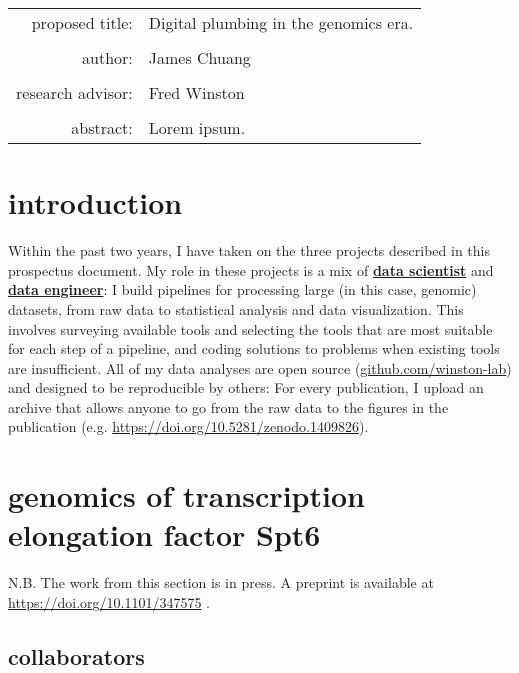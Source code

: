 \documentclass[9pt, letterpaper]{article}
\begin{document}
\begin{titlepage}
\begin{tabular}{ r l }
 proposed title:   & Digital plumbing in the genomics era. \\
 		   & \\
 author:	   & James Chuang \\
 		   & \\
 research advisor: & Fred Winston \\
 		   & \\
 abstract:	   & Lorem ipsum.
\end{tabular}
\end{titlepage}

\tableofcontents
\newpage

\section{introduction}

Within the past two years, I have taken on the three projects described in this prospectus document. My role in these projects is a mix of \href{https://blog.insightdatascience.com/data-science-vs-data-engineering-62da7678adaa}{\textbf{data scientist}} and \href{https://blog.insightdatascience.com/data-science-vs-data-engineering-62da7678adaa}{\textbf{data engineer}}: I build pipelines for processing large (in this case, genomic) datasets, from raw data to statistical analysis and data visualization. This involves surveying available tools and selecting the tools that are most suitable for each step of a pipeline, and coding solutions to problems when existing tools are insufficient. All of my data analyses are open source (\url{github.com/winston-lab}) and designed to be reproducible by others: For every publication, I upload an archive that allows anyone to go from the raw data to the figures in the publication (e.g. \url{https://doi.org/10.5281/zenodo.1409826}).

\section{genomics of transcription elongation factor Spt6}

N.B. The work from this section is in press. A preprint is available at \url{https://doi.org/10.1101/347575} \cite{doris2018}.

\subsection{collaborators}
\end{document}
